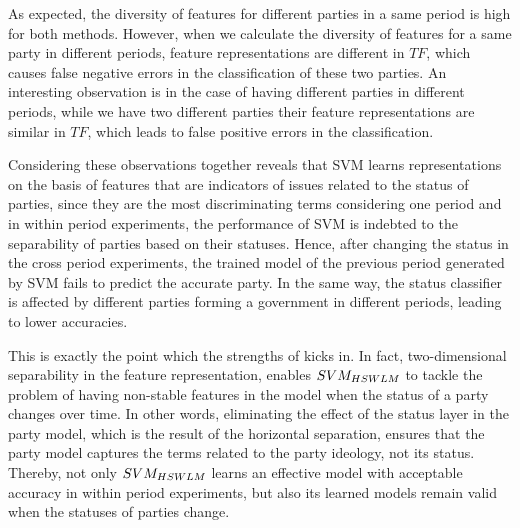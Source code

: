 As expected, the diversity of features for different parties in a same period is high for both methods. However, when we calculate the diversity of features for a same party in different periods, feature representations are different in  $TF$, which causes false negative errors in the classification of these two parties. An interesting observation is in the case of having different parties in different periods, while we have two different parties their feature representations are similar in $TF$, which leads to false positive errors in the classification. 

Considering these observations together reveals that SVM learns representations on the basis of features that are indicators of issues related to the status of parties, since they are the most discriminating terms considering one period and in within period experiments, the performance of SVM is indebted to the separability of parties based on their statuses. Hence, after changing the status in the cross period experiments, the trained model of the previous period generated by SVM fails to predict the accurate party.  In the same way, the status classifier is affected by different parties forming a government in different periods, leading to lower accuracies.   

This is exactly the point which the strengths of \achswlm kicks in. In fact, two-dimensional separability in the feature representation, enables $SVM_{HSWLM}$ to tackle the problem of having non-stable features in the model when the status of a party changes over time. In other words, eliminating the effect of the status layer in the party model, which is the result of the horizontal separation, ensures that the party model captures the terms related to the party ideology, not its status. Thereby, not only $SVM_{HSWLM}$ learns an effective model with acceptable accuracy in within period experiments, but also its learned models remain valid when the statuses of parties change. 
